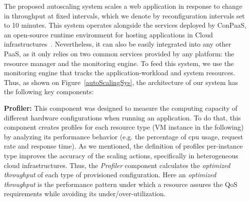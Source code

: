 
The proposed autoscaling system scales a web application in response to change in throughput at fixed intervals, which we denote by reconfiguration intervals set to 10 minutes.  This system operates alongside the services deployed by ConPaaS, an open-source runtime environment for hosting applications in Cloud infrastructures~\cite{conpaasIC}. Nevertheless, it can also be easily integrated into any other PaaS, as it only relies on two common services provided by any platform: the resource manager and the monitoring engine. To feed this system, we use the monitoring engine that tracks the application-workload and system resources. Thus, as shown on Figure~\ref{autoScalingSys}, the architecture of our system has the following key components:





\textbf{Profiler:} This component was designed to measure the computing capacity of different hardware configurations when running an application. To do that, this component creates profiles for each resource type (VM instance in the following) by analyzing its performance behavior (e.g. the percentage of cpu usage, request rate and response time).  As we mentioned, the definition of profiles per-instance type improves the accuracy of the scaling actions, specifically in heterogeneous cloud infrastructures. Thus, the \emph{Profiler} component calculates the \emph{optimized throughput} of each type of provisioned configuration. Here an \emph{optimized throughput} is the performance pattern under which a resource assures the QoS requirements while avoiding its under/over-utilization.






